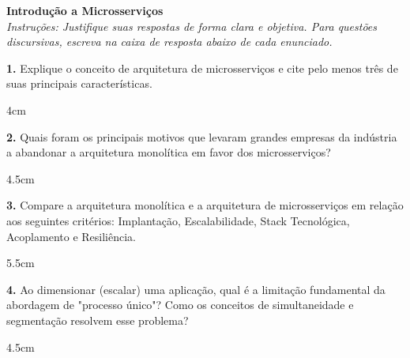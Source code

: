 \documentclass[12pt]{article}
\begin{document}

\vspace*{0.2cm}

\begin{center}
  {\Large \textbf{Introdução a Microsserviços}}\\[0.2cm]
  \textit{Instruções: Justifique suas respostas de forma clara e objetiva.
  Para questões discursivas, escreva na caixa de resposta abaixo de cada enunciado.}
\end{center}

\vspace{0.4cm}

\textbf{1.} Explique o conceito de arquitetura de microsserviços e cite pelo menos três de suas principais características.
\begin{resposta}{4cm}
\end{resposta}

\vspace{0.5cm}

\textbf{2.} Quais foram os principais motivos que levaram grandes empresas da indústria a abandonar a arquitetura monolítica em favor dos microsserviços?
\begin{resposta}{4.5cm}
\end{resposta}

\vspace{0.5cm}

\textbf{3.} Compare a arquitetura monolítica e a arquitetura de microsserviços em relação aos seguintes critérios: Implantação, Escalabilidade, Stack Tecnológica, Acoplamento e Resiliência.
\begin{resposta}{5.5cm}
\end{resposta}

\vspace{0.5cm}

\textbf{4.} Ao dimensionar (escalar) uma aplicação, qual é a limitação fundamental da abordagem de "processo único"? Como os conceitos de simultaneidade e segmentação resolvem esse problema?
\begin{resposta}{4.5cm}
\end{resposta}
\end{document}
